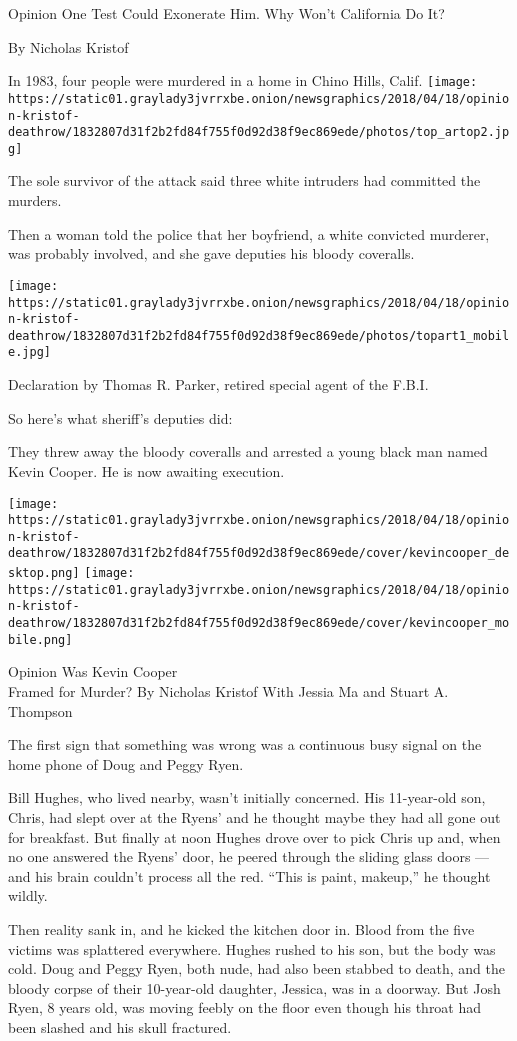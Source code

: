  Opinion One Test Could Exonerate Him. Why Won't California Do It?

By Nicholas Kristof

In 1983, four people were murdered in a home in Chino Hills, Calif.
\texttt{[image: https://static01.graylady3jvrrxbe.onion/newsgraphics/2018/04/18/opinion-kristof-deathrow/1832807d31f2b2fd84f755f0d92d38f9ec869ede/photos/top\_artop2.jpg]}

The sole survivor of the attack said three white intruders had committed
the murders.

Then a woman told the police that her boyfriend, a white convicted
murderer, was probably involved, and she gave deputies his bloody
coveralls.

\texttt{[image: https://static01.graylady3jvrrxbe.onion/newsgraphics/2018/04/18/opinion-kristof-deathrow/1832807d31f2b2fd84f755f0d92d38f9ec869ede/photos/topart1\_mobile.jpg]}

Declaration by Thomas R. Parker, retired special agent of the F.B.I.

So here's what sheriff's deputies did:

They threw away the bloody coveralls and arrested a young black man
named Kevin Cooper. He is now awaiting execution.

\texttt{[image: https://static01.graylady3jvrrxbe.onion/newsgraphics/2018/04/18/opinion-kristof-deathrow/1832807d31f2b2fd84f755f0d92d38f9ec869ede/cover/kevincooper\_desktop.png]}
\texttt{[image: https://static01.graylady3jvrrxbe.onion/newsgraphics/2018/04/18/opinion-kristof-deathrow/1832807d31f2b2fd84f755f0d92d38f9ec869ede/cover/kevincooper\_mobile.png]}

 Opinion Was Kevin Cooper\\
Framed for Murder? By Nicholas Kristof With Jessia Ma and Stuart A.
Thompson

The first sign that something was wrong was a continuous busy signal on
the home phone of Doug and Peggy Ryen.

Bill Hughes, who lived nearby, wasn't initially concerned. His
11-year-old son, Chris, had slept over at the Ryens' and he thought
maybe they had all gone out for breakfast. But finally at noon Hughes
drove over to pick Chris up and, when no one answered the Ryens' door,
he peered through the sliding glass doors --- and his brain couldn't
process all the red. ``This is paint, makeup,'' he thought wildly.

Then reality sank in, and he kicked the kitchen door in. Blood from the
five victims was splattered everywhere. Hughes rushed to his son, but
the body was cold. Doug and Peggy Ryen, both nude, had also been stabbed
to death, and the bloody corpse of their 10-year-old daughter, Jessica,
was in a doorway. But Josh Ryen, 8 years old, was moving feebly on the
floor even though his throat had been slashed and his skull fractured.

